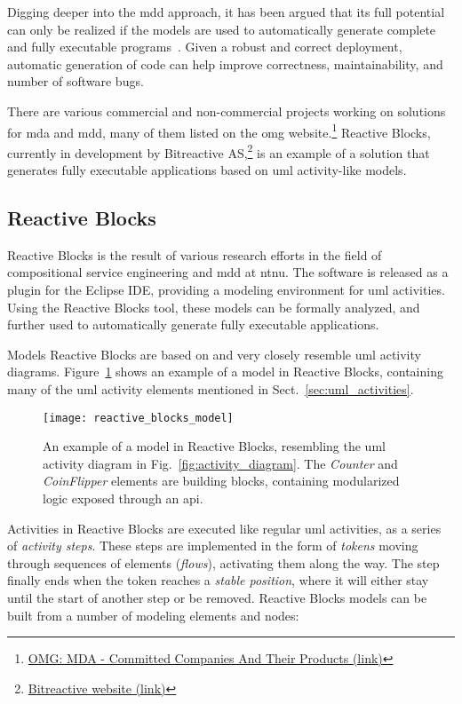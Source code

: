 \noindent
Digging deeper into the \gls{mdd} approach, it has been argued that its full potential can only be realized if the models are used to automatically generate complete and fully executable programs~\cite{selic:model_driven_development}. Given a robust and correct deployment, automatic generation of code can help improve correctness, maintainability, and number of software bugs.

\noindent
There are various commercial and non-commercial projects working on solutions for \gls{mda} and \gls{mdd}, many of them listed on the \gls{omg} website.\footnote{\href{http://www.omg.org/mda/committed-products.htm}{OMG: MDA - Committed Companies And Their Products (link)}} Reactive Blocks, currently in development by Bitreactive AS,\footnote{\href{http://www.bitreactive.com/}{Bitreactive website (link)}} is an example of a solution that generates fully executable applications based on \gls{uml} activity-like models.

\subsection{Reactive Blocks}
\label{sec:reactive_blocks}
Reactive Blocks is the result of various research efforts in the field of compositional service engineering and \gls{mdd} at \gls{ntnu}\cite{kraemer:arctis_ramses}. The software is released as a plugin for the Eclipse IDE, providing a modeling environment for \gls{uml} activities. Using the Reactive Blocks tool, these models can be formally analyzed, and further used to automatically generate fully executable applications.

\noindent
Models Reactive Blocks are based on and very closely resemble \gls{uml} activity diagrams. Figure~\ref{fig:reactive_blocks_model} shows an example of a model in Reactive Blocks, containing many of the \gls{uml} activity elements mentioned in Sect.~\ref{sec:uml_activities}.

\begin{figure}[htp]
	\centering
	\texttt{[image: reactive\_blocks\_model]}
	\caption[Reactive Blocks model example]{An example of a model in Reactive Blocks, resembling the \gls{uml} activity diagram in Fig.~\ref{fig:activity_diagram}. The \emph{Counter} and \emph{CoinFlipper} elements are building blocks, containing modularized logic exposed through an \gls{api}.}
	\label{fig:reactive_blocks_model}
\end{figure}

\noindent
Activities in Reactive Blocks are executed like regular \gls{uml} activities, as a series of \emph{activity steps}. These steps are implemented in the form of \emph{tokens} moving through sequences of elements (\emph{flows}), activating them along the way. The step finally ends when the token reaches a \emph{stable position}, where it will either stay until the start of another step or be removed. Reactive Blocks models can be built from a number of modeling elements and nodes:

